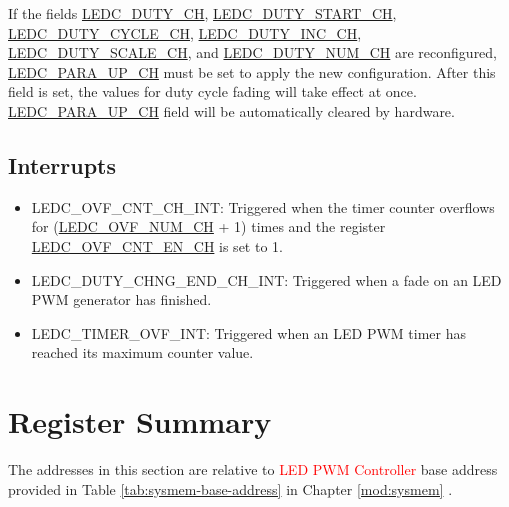 \documentclass[main\_\_EN.tex]{subfiles}
\begin{document}
If the fields 
\hyperref[fielddesc:LEDCDUTYCHN]{LEDC\_DUTY\_CH},
\hyperref[fielddesc:LEDCDUTYSTARTCHN]{LEDC\_DUTY\_START\_CH},
\hyperref[fielddesc:LEDCDUTYCYCLECHN]{LEDC\_DUTY\_CYCLE\_CH},
\hyperref[fielddesc:LEDCDUTYINCCHN]{LEDC\_DUTY\_INC\_CH},
\hyperref[fielddesc:LEDCDUTYSCALECHN]{LEDC\_DUTY\_SCALE\_CH}, and
\hyperref[fielddesc:LEDCDUTYNUMCHN]{LEDC\_DUTY\_NUM\_CH}  are reconfigured, \hyperref[fielddesc:LEDCPARAUPCHN]{LEDC\_PARA\_UP\_CH} must be set to apply the new configuration. After this field is set, the values for duty cycle fading will take effect at once. \hyperref[fielddesc:LEDCPARAUPCHN]{LEDC\_PARA\_UP\_CH} field will be automatically cleared by hardware.

\subsection{Interrupts}
\begin{itemize}
\item \label{int:ledc-ovf-cnt}LEDC\_OVF\_CNT\_CH\_INT: Triggered when the timer counter overflows for (\hyperref[fielddesc:LEDCOVFNUMCHN]{LEDC\_OVF\_NUM\_CH} + 1) times and the register \hyperref[fielddesc:LEDCOVFCNTENCHN]{LEDC\_OVF\_CNT\_EN\_CH} is set to 1.
\item \label{int:ledc-duty-chng-end}LEDC\_DUTY\_CHNG\_END\_CH\_INT: Triggered when a fade on an LED PWM generator has finished.
\item \label{int:ledc-timer-ovf}LEDC\_TIMER\_OVF\_INT: Triggered when an LED PWM timer has reached its maximum counter value.
\end{itemize}





\clearpage
\hypertarget{ledpwm-reg-summ}{}
\section{Register Summary}
\label{sec:ledpwm-reg-summ}

The addresses in this section are relative to \textcolor{red}{LED PWM Controller} base address provided in Table \ref{tab:sysmem-base-address} in Chapter \ref{mod:sysmem} \textit{}.
\end{document}
